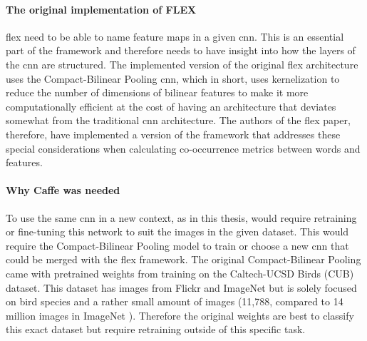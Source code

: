             
            \paragraph{The original implementation of FLEX\\}
            \gls{flex} need to be able to name feature maps in a given \gls{cnn}. This is an essential part of the framework and therefore needs to have insight into how the layers of the \gls{cnn} are structured.
            The implemented version of the original \gls{flex} architecture uses the Compact-Bilinear Pooling \gls{cnn}, which in short, uses kernelization to reduce the number of dimensions of bilinear features to make it more computationally efficient at the cost of having an architecture that deviates somewhat from the traditional \gls{cnn} architecture. The authors of the \gls{flex} paper, therefore, have implemented a version of the framework that addresses these special considerations when calculating co-occurrence metrics between words and features. 
        

            \paragraph{Why Caffe was needed\\}
            To use the same \gls{cnn} in a new context, as in this thesis, would require retraining or fine-tuning this network to suit the images in the given dataset. This would require the Compact-Bilinear Pooling model to train or choose a new \gls{cnn} that could be merged with the \gls{flex} framework. The original Compact-Bilinear Pooling came with pretrained weights from training on the Caltech-UCSD Birds (CUB) \cite{PeronaLabCUB2002011} dataset. This dataset has images from Flickr and ImageNet but is solely focused on bird species and a rather small amount of images (11,788, compared to 14 million images in ImageNet \cite{dengImageNetLargeScaleHierarchical2009}). Therefore the original weights are best to classify this exact dataset but require retraining outside of this specific task.

